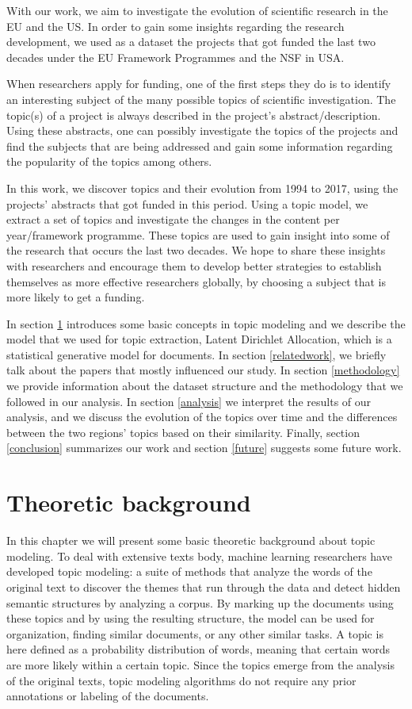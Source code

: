 \documentclass[12pt]{report}
\begin{document}
With our work, we aim to investigate the evolution of scientific
research in the EU and the US. In order to gain some insights  regarding
the research development, we used as a dataset the projects that got funded 
the last two decades under the EU Framework Programmes and the NSF in USA.

When researchers apply for funding, one of the first steps they do is
to identify an interesting subject of the many possible topics of
scientific investigation. The topic(s) of a project is always
described in the project's abstract/description. Using these abstracts, 
one can possibly investigate the topics of the projects and find the 
subjects that are being addressed and gain some information regarding 
the popularity of the topics among others.

In this work, we discover topics and their evolution from 1994 to
2017, using the projects' abstracts that got funded in this
period. Using a topic model, we extract a set of topics and
investigate the changes in the content per year/framework programme.
These topics are used to gain insight into some of the research that
occurs the last two decades. We hope to share these insights with
researchers and encourage them to develop better strategies to
establish themselves as more effective researchers globally, by
choosing a subject that is more likely to get a funding.

In section \ref{theoretic} introduces some basic concepts
in topic modeling and we describe the model that we used for topic
extraction, Latent Dirichlet Allocation, which is a statistical
generative model for documents. In section \ref{relatedwork}, 
we briefly talk about the papers that mostly influenced our study. 
In section \ref{methodology} we provide information
about the dataset structure and the methodology that we followed in
our analysis. In section \ref{analysis} we interpret the results of 
our analysis, and we discuss the evolution of the topics over time and the
differences between the two regions' topics based on their similarity.
Finally, section \ref{conclusion} summarizes our work and section 
\ref{future} suggests some future work.

\section{Theoretic background}
\label{theoretic}
In this chapter we will present some basic theoretic background about
topic modeling. To deal with extensive texts body, machine learning 
researchers have developed topic modeling:
a suite of methods that analyze the words of the original text to
discover the themes that run through the data and detect hidden
semantic structures by analyzing a corpus. By marking up the documents
using these topics and by using the resulting structure, the model can
be used for organization, finding similar documents, or any other
similar tasks. A topic is here defined as a probability distribution
of words, meaning that certain words are more likely within a certain
topic. Since the topics emerge from the analysis of the original
texts, topic modeling algorithms do not require any prior annotations
or labeling of the documents\cite{Blei11introductionto}.
\end{document}
